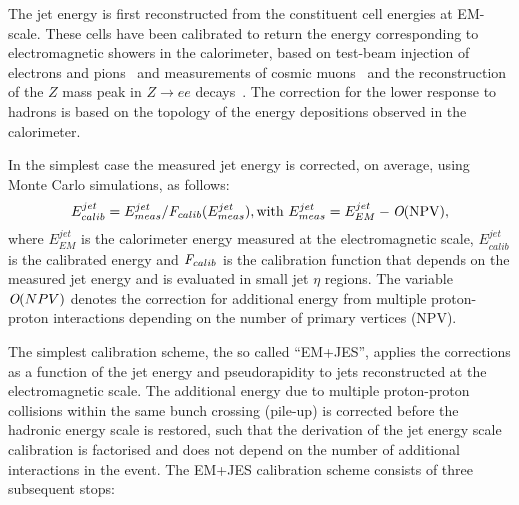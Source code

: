 The jet energy is first reconstructed from the constituent cell energies at EM-scale. These cells have been calibrated to return the energy corresponding to electromagnetic showers in the calorimeter, based on test-beam injection of electrons and pions~\cite{Aharrouche2006601} and measurements of cosmic muons~\cite{Cooke:1071187} and the reconstruction of the $Z$ mass peak in $Z \rightarrow ee$ decays~\cite{Aad:2011mk}. The correction for the lower response to hadrons is based on the topology of the energy depositions observed in the calorimeter. 

In the simplest case the measured jet energy is corrected, on average, using Monte Carlo simulations, as follows:
%
\begin{equation}
E^{jet}_{calib} = E^{jet}_{meas} / \emph{F}_{calib}(E^{jet}_{meas}),   \mbox{with  }   E^{jet}_{meas} = E^{jet}_{EM} - \emph{O}(\mbox{NPV}),
\end{equation}
%
where $E^{jet}_{EM}$ is the calorimeter energy measured at the electromagnetic scale, $E^{jet}_{calib}$ is the calibrated energy and $\emph{F}_{calib}$ is the calibration function that depends on the measured jet energy and is evaluated in small jet $\eta$ regions. The variable $ \emph{O}(NPV)$ denotes the correction for additional energy from multiple proton-proton interactions depending on the number of primary vertices (NPV).

The simplest calibration scheme, the so called ``EM+JES'', applies the corrections as a function of the jet energy and pseudorapidity to jets reconstructed at the electromagnetic scale.  The additional energy due to multiple proton-proton collisions within the same bunch crossing (pile-up) is corrected before the hadronic energy scale is restored, such that the derivation of the jet energy scale calibration is factorised and does not depend on the number of additional interactions in the event. The EM+JES calibration scheme consists of three subsequent stops:

